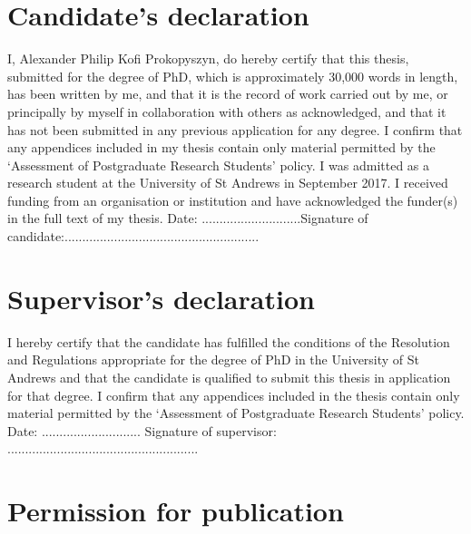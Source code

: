 \documentclass[12pt,fleqn]{report}
\numberwithin{equation}{section}
\begin{document}
\onehalfspacing

% 



\newpage

\section*{Candidate’s declaration}

I, Alexander Philip Kofi Prokopyszyn, do hereby certify that this thesis, submitted for the degree of PhD, which is approximately 30,000 words in length, has been written by me, and that it is the record of work carried out by me, or principally by myself in collaboration with others as acknowledged, and that it has not been submitted in any previous application for any degree. I confirm that any appendices included in my thesis contain only material permitted by the `Assessment of Postgraduate Research Students' policy.
\vskip 0.2in
\noindent I was admitted as a research student at the University of St Andrews in September 2017.
\vskip 0.2in
\noindent I received funding from an organisation or institution and have acknowledged the funder(s) in the full text of my thesis.
\vskip 0.2in
\noindent Date: ............................\quad Signature of candidate:.......................................................
\vskip 1in

\section*{Supervisor’s declaration}

I hereby certify that the candidate has fulfilled the conditions of the Resolution and Regulations appropriate for the degree of PhD in the University of St Andrews and that the candidate is qualified to submit this thesis in application for that degree. I confirm that any appendices included in the thesis contain only material permitted by the `Assessment of Postgraduate Research Students' policy.
\vskip 0.2in
\noindent Date: ............................ \quad Signature of supervisor: ......................................................

\newpage

\section*{Permission for publication}
\end{document}
